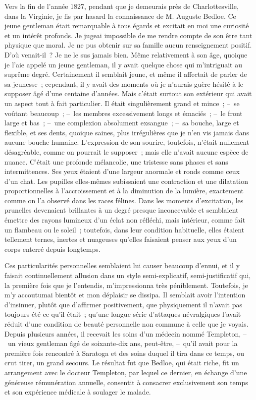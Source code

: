 \documentclass[french,twoside]{book} %
\begin{document}
\noindent Vers la fin de l’année 1827, pendant que je demeurais près de Charlottesville, dans la Virginie, je fis par hasard la connaissance de M. Auguste Bedloe. Ce jeune gentleman était remarquable à tous égards et excitait en moi une curiosité et un intérêt profonds. Je jugeai impossible de me rendre compte de son être tant physique que moral. Je ne pus obtenir sur sa famille aucun renseignement positif. D’où venait-il ? Je ne le sus jamais bien. Même relativement à son âge, quoique je l’aie appelé un jeune gentleman, il y avait quelque chose qui m’intriguait au suprême degré. Certainement il semblait jeune, et même il affectait de parler de sa jeunesse ; cependant, il y avait des moments où je n’aurais guère hésité à le supposer âgé d’une centaine d’années. Mais c’était surtout son extérieur qui avait un aspect tout à fait particulier. Il était singulièrement grand et mince ; – se voûtant beaucoup ; – les membres excessivement longs et émaciés ; – le front large et bas ; – une complexion absolument exsangue ; – sa bouche, large et flexible, et ses dents, quoique saines, plus irrégulières que je n’en vis jamais dans aucune bouche humaine. L’expression de son sourire, toutefois, n’était nullement désagréable, comme on pourrait le supposer ; mais elle n’avait aucune espèce de nuance. C’était une profonde mélancolie, une tristesse sans phases et sans intermittences. Ses yeux étaient d’une largeur anormale et ronds comme ceux d’un chat. Les pupilles elles-mêmes subissaient une contraction et une dilatation proportionnelles à l’accroissement et à la diminution de la lumière, exactement comme on l’a observé dans les races félines. Dans les moments d’excitation, les prunelles devenaient brillantes à un degré presque inconcevable et semblaient émettre des rayons lumineux d’un éclat non réfléchi, mais intérieur, comme fait un flambeau ou le soleil ; toutefois, dans leur condition habituelle, elles étaient tellement ternes, inertes et nuageuses qu’elles faisaient penser aux yeux d’un corps enterré depuis longtemps.\par
Ces particularités personnelles semblaient lui causer beaucoup d’ennui, et il y faisait continuellement allusion dans un style semi-explicatif, semi-justificatif qui, la première fois que je l’entendis, m’impressionna très péniblement. Toutefois, je m’y accoutumai bientôt et mon déplaisir se dissipa. Il semblait avoir l’intention d’insinuer, plutôt que d’affirmer positivement, que physiquement il n’avait pas toujours été ce qu’il était ; qu’une longue série d’attaques névralgiques l’avait réduit d’une condition de beauté personnelle non commune à celle que je voyais. Depuis plusieurs années, il recevait les soins d’un médecin nommé Templeton, – un vieux gentleman âgé de soixante-dix ans, peut-être, – qu’il avait pour la première fois rencontré à Saratoga et des soins duquel il tira dans ce temps, ou crut tirer, un grand secours. Le résultat fut que Bedloe, qui était riche, fit un arrangement avec le docteur Templeton, par lequel ce dernier, en échange d’une généreuse rémunération annuelle, consentit à consacrer exclusivement son temps et son expérience médicale à soulager le malade.\par
\end{document}
